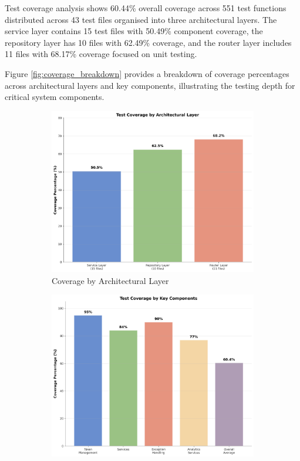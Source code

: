 Test coverage analysis shows 60.44\% overall coverage across 551 test functions distributed across 43 test files organised into three architectural layers. The service layer contains 15 test files with 50.49\% component coverage, the repository layer has 10 files with 62.49\% coverage, and the router layer includes 11 files with 68.17\% coverage focused on unit testing.

Figure \ref{fig:coverage_breakdown} provides a breakdown of coverage percentages across architectural layers and key components, illustrating the testing depth for critical system components.

\begin{figure}[htbp]
    \centering
    \begin{subfigure}[t]{0.48\textwidth}
        \centering
        \includegraphics[width=\textwidth]{figs/chapter5/coverage_by_layer.png}
        \caption{Coverage by Architectural Layer}
        \label{fig:coverage_by_layer}
    \end{subfigure}
    \hfill
    \begin{subfigure}[t]{0.48\textwidth}
        \centering
        \includegraphics[width=\textwidth]{figs/chapter5/coverage_by_component.png}

\end{subfigure}
\end{figure}
